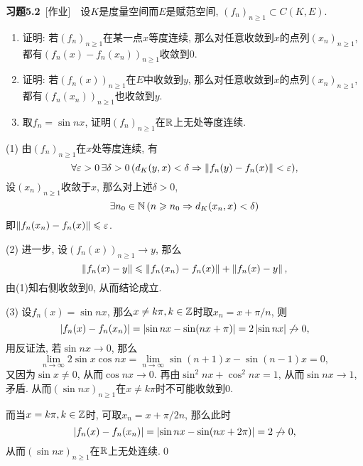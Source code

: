 	\textbf{习题5.2}\ [作业]\ \ 设$ K $是度量空间而$ E $是赋范空间, $ (f_n)_{n\geqslant 1}\subset C(K,E) $.
	\begin{enumerate}[(1)]
	\item 证明: 若$ (f_n)_{n\geqslant 1} $在某一点$ x $等度连续, 那么对任意收敛到$ x $的点列$ (x_n)_{n\geqslant 1} $, 都有$ (f_n(x)-f_n(x_n))_{n\geqslant 1} $收敛到0.
	\item 证明: 若$ (f_n(x))_{n\geqslant 1} $在$ E $中收敛到$ y $, 那么对任意收敛到$ x $的点列$ (x_n)_{n\geqslant 1} $, 都有$ (f_n(x_n))_{n\geqslant 1} $也收敛到$ y $.
	\item 取$ f_n=\sin nx $, 证明$ (f_n)_{n\geqslant 1} $在$ \mathbb{R} $上无处等度连续.
	\end{enumerate}
	\begin{Proof}
	(1) 由$ (f_n)_{n\geqslant 1} $在$ x $处等度连续, 有
	\[
	\forall\varepsilon>0\,\exists\delta>0\,(d_K(y,x)<\delta\Rightarrow \left\| f_n(y)-f_n(x) \right\|<\varepsilon),
	\]
	设$ (x_n)_{n\geqslant 1} $收敛于$ x $, 那么对上述$ \delta>0 $,
	\[
	\exists n_0\in\mathbb{N}\,(n\geqslant n_0\Rightarrow d_K(x_n,x)<\delta)
	\]
	即$ \left\| f_n(x_n)-f_n(x) \right\|\leqslant\varepsilon $.
	
	(2) 进一步, 设$ (f_n(x))_{n\geqslant 1}\to y $, 那么
	\[
	\left\| f_n(x)-y \right\|\leqslant\left\| f_n(x_n)-f_n(x) \right\|+\left\| f_n(x)-y \right\|,
	\]
	由(1)知右侧收敛到0, 从而结论成立.
	
	(3) 设$ f_n(x)=\sin nx $, 那么$ x\ne k\pi, k\in\mathbb{Z} $时取$ x_n=x+\pi/n $, 则
	\[
	\left| f_n(x)-f_n(x_n) \right| =\left| \sin nx-\sin(nx+\pi) \right| =2\left| \sin nx \right| \not\to 0,
	\]
	用反证法, 若$ \sin nx\to 0 $, 那么
	\[
	\lim_{n\to\infty}2\sin x\cos nx=\lim_{n\to\infty}\sin(n+1)x-\sin(n-1)x=0,
	\]
	又因为$ \sin x\ne 0 $, 从而$ \cos nx\to 0 $. 再由$ \sin^2 nx+\cos^2 nx=1 $, 从而$ \sin nx\to 1 $, 矛盾. 从而$ (\sin nx)_{n\geqslant 1} $在$ x\ne k\pi $时不可能收敛到0.
	
	而当$ x=k\pi, k\in\mathbb{Z} $时, 可取$ x_n=x+\pi/2n $, 那么此时
	\[
	\left| f_n(x)-f_n(x_n) \right| =\left| \sin nx-\sin(nx+2\pi) \right| =2\not\to 0,
	\]
	从而$ (\sin nx)_{n\geqslant 1} $在$ \mathbb{R} $上无处连续.\qed
	\end{Proof}
